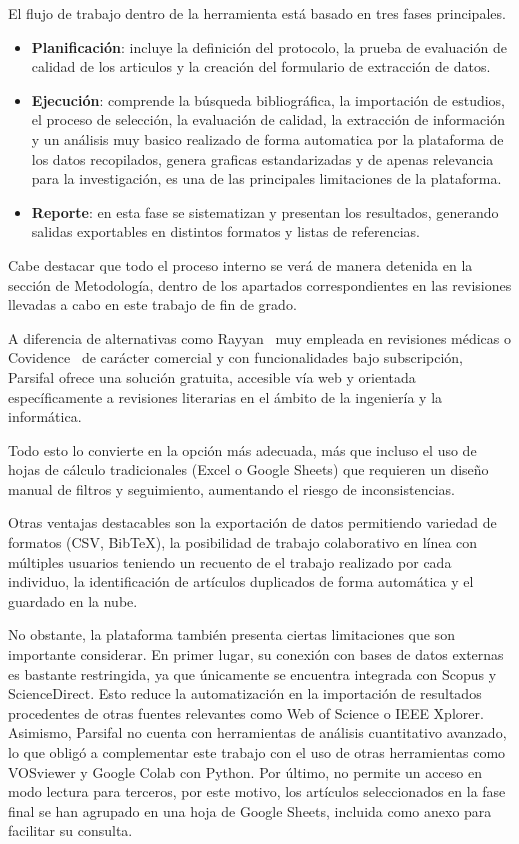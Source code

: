 El flujo de trabajo dentro de la herramienta está basado en tres fases principales.

\begin{itemize}
    \item \textbf{Planificación}: incluye la definición del protocolo, la prueba de evaluación de calidad de los articulos y la creación del formulario de extracción de datos.  
    \item \textbf{Ejecución}: comprende la búsqueda bibliográfica, la importación de estudios, el proceso de selección, la evaluación de calidad, la extracción de información y un análisis muy basico realizado de forma automatica por la plataforma de los datos recopilados, genera graficas estandarizadas y de apenas relevancia para la investigación, es una de las principales limitaciones de la plataforma.  
    \item \textbf{Reporte}: en esta fase se sistematizan y presentan los resultados, generando salidas exportables en distintos formatos y listas de referencias.  
\end{itemize}

Cabe destacar que todo el proceso interno se verá de manera detenida en la sección de Metodología, dentro de los apartados correspondientes en las revisiones llevadas a cabo en este trabajo de fin de grado.

A diferencia de alternativas como Rayyan~\cite{RayyanSite} muy empleada en revisiones médicas o Covidence~\cite{CovidenceSite} de carácter comercial y con funcionalidades bajo subscripción, Parsifal ofrece una solución gratuita, accesible vía web y orientada específicamente a revisiones literarias en el ámbito de la ingeniería y la informática.

Todo esto lo convierte en la opción más adecuada, más que incluso el uso de hojas de cálculo tradicionales (Excel o Google Sheets) que requieren un diseño manual de filtros y seguimiento, aumentando el riesgo de inconsistencias.

Otras ventajas destacables son la exportación de datos permitiendo variedad de formatos (CSV, BibTeX), la posibilidad de trabajo colaborativo en línea con múltiples usuarios teniendo un recuento de el trabajo realizado por cada individuo, la identificación de artículos duplicados de forma automática y el guardado en la nube.

No obstante, la plataforma también presenta ciertas limitaciones que son importante considerar. En primer lugar, su conexión con bases de datos externas es bastante restringida, ya que únicamente se encuentra integrada con Scopus y ScienceDirect. Esto reduce la automatización en la importación de resultados procedentes de otras fuentes relevantes como Web of Science o IEEE Xplorer. Asimismo, Parsifal no cuenta con herramientas de análisis cuantitativo avanzado, lo que obligó a complementar este trabajo con el uso de otras herramientas como VOSviewer y Google Colab con Python. Por último, no permite un acceso en modo lectura para terceros, por este motivo, los artículos seleccionados en la fase final se han agrupado en una hoja de Google Sheets, incluida como anexo para facilitar su consulta.\\

